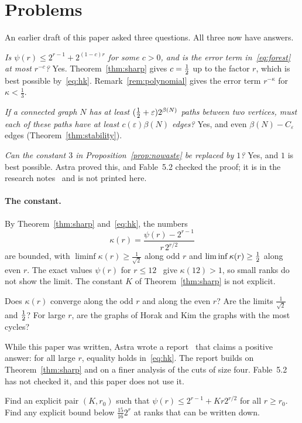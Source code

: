 \section{Problems}\label{sec:problems}

An earlier draft of this paper asked three questions. All three now have answers.

\emph{Is $\psi(r)\le2^{r-1}+2^{(1-c)r}$ for some $c>0$, and is the error term in~\eqref{eq:forest}
at most $r^{-c}$?} Yes. Theorem~\ref{thm:sharp} gives $c=\tfrac12$ up to the factor $r$, which is
best possible by~\eqref{eq:hk}. Remark~\ref{rem:polynomial} gives the error term $r^{-\kappa}$
for $\kappa<\frac13$.

\emph{If a connected graph $N$ has at least $(\tfrac12+\varepsilon)2^{\beta(N)}$ paths between two
vertices, must each of these paths have at least $c(\varepsilon)\beta(N)$ edges?} Yes, and even
$\beta(N)-C_\varepsilon$ edges (Theorem~\ref{thm:stability}).

\emph{Can the constant $3$ in Proposition~\ref{prop:nowaste} be replaced by $1$?} Yes, and $1$ is
best possible. Astra proved this, and Fable~5.2 checked the proof; it is in the research
notes~\cite{S5} and is not printed here.

\paragraph{The constant.}
By Theorem~\ref{thm:sharp} and~\eqref{eq:hk}, the numbers
\[
  \kappa(r)=\frac{\psi(r)-2^{r-1}}{r\,2^{r/2}}
\]
are bounded, with $\liminf\kappa(r)\ge\frac1{\sqrt2}$ along odd $r$ and $\liminf\kappa(r)\ge\tfrac12$
along even $r$. The exact values $\psi(r)$ for $r\le12$~\cite{Markstrom} give $\kappa(12)>1$, so
small ranks do not show the limit. The constant $K$ of Theorem~\ref{thm:sharp} is not explicit.

\begin{problem}
Does $\kappa(r)$ converge along the odd $r$ and along the even $r$? Are the limits $\frac1{\sqrt2}$
and $\tfrac12$? For large $r$, are the graphs of Horak and Kim the graphs with the most cycles?
\end{problem}

While this paper was written, Astra wrote a report~\cite{S6} that claims a positive answer: for all
large $r$, equality holds in~\eqref{eq:hk}. The report builds on Theorem~\ref{thm:sharp} and on a
finer analysis of the cuts of size four. Fable~5.2 has not checked it, and this paper does not use
it.

\begin{problem}
Find an explicit pair $(K,r_0)$ such that $\psi(r)\le2^{r-1}+Kr2^{r/2}$ for all $r\ge r_0$. Find
any explicit bound below $\frac{15}{16}2^{r}$ at ranks that can be written down.
\end{problem}

